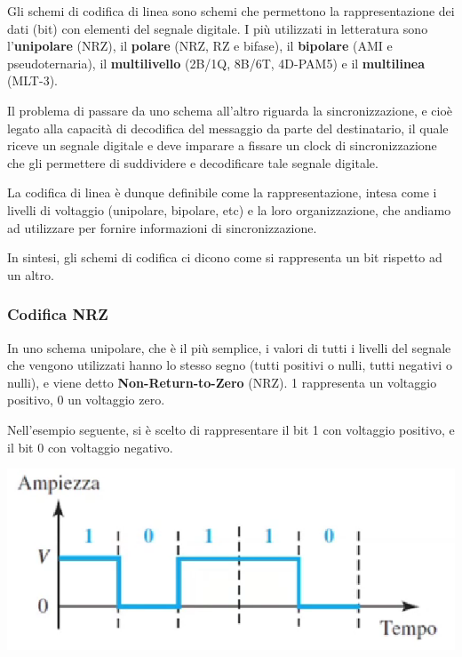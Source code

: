             Gli schemi di codifica di linea sono schemi che permettono la rappresentazione dei dati (bit) con elementi del segnale digitale. I più utilizzati in letteratura sono l'\textbf{unipolare} (NRZ), il \textbf{polare} (NRZ, RZ e bifase), il \textbf{bipolare} (AMI e pseudoternaria), il \textbf{multilivello} (2B/1Q, 8B/6T, 4D-PAM5) e il \textbf{multilinea} (MLT-3). 
            
            Il problema di passare da uno schema all'altro riguarda la sincronizzazione, e cioè legato alla capacità di decodifica del messaggio da parte del destinatario, il quale riceve un segnale digitale e deve imparare a fissare un clock di sincronizzazione che gli permettere di suddividere e decodificare tale segnale digitale.
            
            \vspace{3mm}
            
            La codifica di linea è dunque definibile come la rappresentazione, intesa come i livelli di voltaggio (unipolare, bipolare, etc) e la loro organizzazione, che andiamo ad utilizzare per fornire informazioni di sincronizzazione.
        
            \vspace{3mm}
        
            In sintesi, gli schemi di codifica ci dicono come si rappresenta un bit rispetto ad un altro.
        
        \subsubsection{Codifica NRZ}
        
            In uno schema unipolare, che è il più semplice, i valori di tutti i livelli del segnale che vengono utilizzati hanno lo stesso segno (tutti positivi o nulli, tutti negativi o nulli), e viene detto \textbf{Non-Return-to-Zero} (NRZ). 1 rappresenta un voltaggio positivo, 0 un voltaggio zero.
            
            Nell'esempio seguente, si è scelto di rappresentare il bit 1 con voltaggio positivo, e il bit 0 con voltaggio negativo.
            
            \begin{center}          
                \includegraphics[scale=0.5]{images/NRZ.png}
            \end{center}
            
